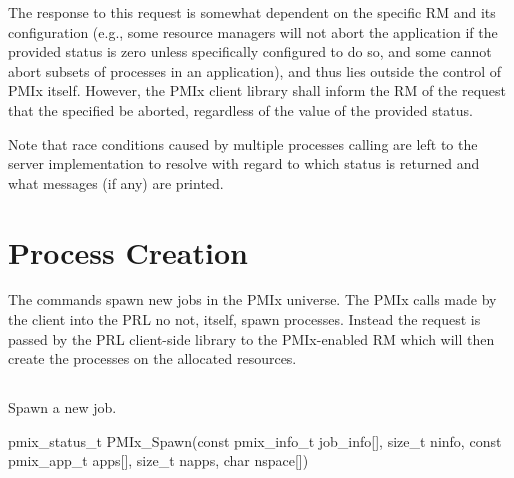 \adviceuserstart
The response to this request is somewhat dependent on the specific \acl{RM} and its configuration (e.g., some resource managers will not abort the application if the provided status is zero unless specifically configured to do so, and some cannot abort subsets of processes in an application), and thus lies outside the control of PMIx itself.
However, the PMIx client library shall inform the \ac{RM} of the request that the specified  be aborted, regardless of the value of the provided status.

Note that race conditions caused by multiple processes calling  are left to the server implementation to resolve with regard to which status is returned and what messages (if any) are printed.
\adviceuserend


\section{Process Creation}
\label{chap:api_proc_mgmt:spawn}

The  commands spawn new jobs in the \ac{PMIx} universe.
The \ac{PMIx} calls made by the client into the \ac{PRL} no not, itself, spawn processes.
Instead the request is passed by the \ac{PRL} client-side library to the \ac{PMIx}-enabled \ac{RM} which will then create the processes on the allocated resources.

\subsection{}

\summary

Spawn a new job.

\format

\cspecificstart
\begin{codepar}
pmix_status_t
PMIx_Spawn(const pmix_info_t job_info[], size_t ninfo,
           const pmix_app_t apps[], size_t napps,
           char nspace[])
\end{codepar}
\cspecificend

\begin{arglist}
\end{arglist}

